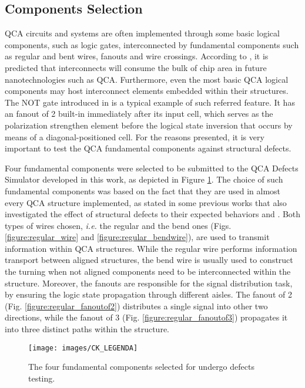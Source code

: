 \subsection{Components Selection}
\label{subsection:Components_Selection}

QCA circuits and systems are often implemented through some basic logical components, such as logic gates, interconnected by fundamental components such as regular and bent wires, fanouts and wire crossings. According to , it is predicted that interconnects will consume the bulk of chip area in future nanotechnologies such as QCA. Furthermore, even the most basic QCA logical components may host interconnect elements embedded within their structures. The NOT gate introduced in \cite{lent93} is a typical example of such referred feature. It has an fanout of 2 built-in immediately after its input cell, which serves as the polarization strengthen element before the logical state inversion that occurs by means of a diagonal-positioned cell. For the reasons presented, it is very important to test the QCA fundamental components against structural defects.

Four fundamental components were selected to be submitted to the QCA Defects Simulator developed in this work, as depicted in Figure \ref{figure:fundamental_components}. The choice of such fundamental components was based on the fact that they are used in almost every QCA structure implemented, as stated in some previous works that also investigated the effect of structural defects to their expected behaviors \cite{yang12} and \cite{karim09}. Both types of wires chosen, \textit{i.e.} the regular and the bend ones (Figs. \ref{figure:regular_wire} and \ref{figure:regular_bendwire}), are used to transmit information within QCA structures. While the regular wire performs information transport between aligned structures, the bend wire is usually used to construct the turning when not aligned components need to be interconnected within the structure. Moreover, the fanouts are responsible for the signal distribution task, by ensuring the logic state propagation through different aisles. The fanout of 2 (Fig. \ref{figure:regular_fanoutof2}) distributes a single signal into other two directions, while the fanout of 3 (Fig. \ref{figure:regular_fanoutof3}) propagates it into three distinct paths within the structure.

\begin{figure}[!ht]
\center
{}
\hfill
{}
\linebreak
{}
\hfill
{}
\linebreak
{\texttt{[image: images/CK\_LEGENDA]}
}
\caption{The four fundamental components selected for undergo defects testing.}
\label{figure:fundamental_components}
\end{figure}

